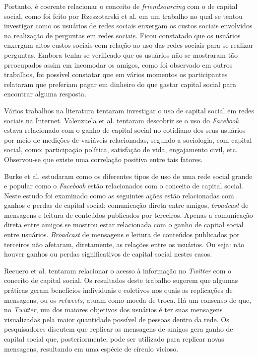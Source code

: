 Portanto, é coerente relacionar o conceito de \textit{friendsourcing} com o de capital social, como foi feito por Rzeszotarski et al. \cite{rzeszotarski2014estimating} em um trabalho no qual se tentou investigar como os usuários de redes sociais enxergam os custos sociais envolvidos na realização de perguntas em redes sociais. Ficou constatado que os usuários enxergam altos custos sociais com relação ao uso das redes sociais para se realizar perguntas. Embora tenha-se verificado que os usuários não se mostraram tão preocupados assim em incomodar os amigos, como foi observado em outros trabalhos, foi possível constatar que em vários momentos os participantes relataram que preferiam pagar em dinheiro do que gastar capital social para encontrar alguma resposta.   

Vários trabalhos na literatura tentaram investigar o uso de capital social em redes sociais na Internet. Valenzuela et al. \cite{valenzuela2009there} tentaram descobrir se o uso do \textit{Facebook} estava relacionado com o ganho de capital social no cotidiano dos seus usuários por meio de medições de variáveis relacionadas, segundo a sociologia, com capital social, como: participação política, satisfação de vida, engajamento civil, etc. Observou-se que existe uma correlação positiva entre tais fatores.

Burke et al. \cite{Burke:2011:SCF:1978942.1979023} estudaram como os diferentes tipos de uso de uma rede social grande e popular como o \textit{Facebook} estão relacionados com o conceito de capital social. Neste estudo foi examinado como as seguintes ações estão relacionadas com ganhos e perdas de capital social: comunicação direta entre amigos, \textit{broadcast} de mensagens e leitura de conteúdos publicados por terceiros. Apenas a comunicação direta entre amigos se mostrou estar relacionada com o ganho de capital social entre usuários. \textit{Broadcast} de mensagens e leitura de conteúdos publicados por terceiros não afetaram, diretamente, as relações entre os usuários. Ou seja: não houver ganhos ou perdas significativos de capital social nestes casos.

Recuero et al. \cite{recuero2012economia} tentaram relacionar o acesso à informação no \textit{Twitter} com o conceito de capital social. Os resultados deste trabalho sugerem que algumas práticas geram benefícios individuais e coletivos nos quais as replicações de mensagens, ou os \textit{retweets}, atuam como moeda de troca. Há um consenso de que, no \textit{Twitter}, um dos maiores objetivos dos usuários é ter suas mensagens visualizadas pela maior quantidade possível de pessoas dentro da rede. Os pesquisadores discutem que replicar as mensagens de amigos gera ganho de capital social que, posteriormente, pode ser utilizado para replicar novas mensagens, resultando em uma espécie de círculo vicioso.

